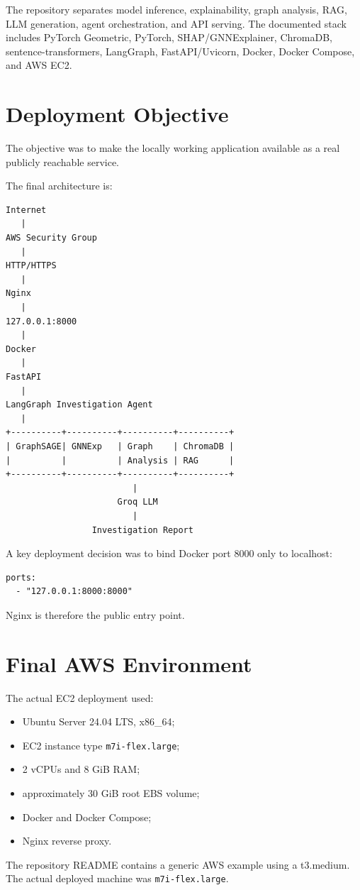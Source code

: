 \documentclass[11pt,a4paper]{article}
\begin{document}
The repository separates model inference, explainability, graph analysis, RAG, LLM generation, agent orchestration, and API serving. The documented stack includes PyTorch Geometric, PyTorch, SHAP/GNNExplainer, ChromaDB, sentence-transformers, LangGraph, FastAPI/Uvicorn, Docker, Docker Compose, and AWS EC2.

\section{Deployment Objective}
The objective was to make the locally working application available as a real publicly reachable service.

The final architecture is:
\begin{lstlisting}
Internet
   |
AWS Security Group
   |
HTTP/HTTPS
   |
Nginx
   |
127.0.0.1:8000
   |
Docker
   |
FastAPI
   |
LangGraph Investigation Agent
   |
+----------+----------+----------+----------+
| GraphSAGE| GNNExp   | Graph    | ChromaDB |
|          |          | Analysis | RAG      |
+----------+----------+----------+----------+
                         |
                      Groq LLM
                         |
                 Investigation Report
\end{lstlisting}

A key deployment decision was to bind Docker port 8000 only to localhost:
\begin{lstlisting}
ports:
  - "127.0.0.1:8000:8000"
\end{lstlisting}
Nginx is therefore the public entry point.

\section{Final AWS Environment}
The actual EC2 deployment used:
\begin{itemize}
\item Ubuntu Server 24.04 LTS, x86\_64;
\item EC2 instance type \texttt{m7i-flex.large};
\item 2 vCPUs and 8 GiB RAM;
\item approximately 30 GiB root EBS volume;
\item Docker and Docker Compose;
\item Nginx reverse proxy.
\end{itemize}

The repository README contains a generic AWS example using a t3.medium. The actual deployed machine was \texttt{m7i-flex.large}.
\end{document}
